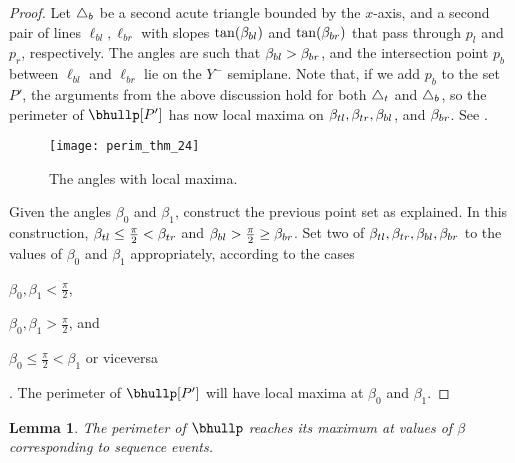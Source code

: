 \documentclass[11pt,letterpaper,english]{article}
\newtheorem{lemma}{Lemma}
\theoremstyle{definition}
\begin{document}
\begin{proof}
  Let $\triangle_b$ be a second acute triangle bounded by the $x$-axis, and
  a second pair of lines $\ell_{bl},\ell_{br}$ with slopes
  $\tan(\beta_{bl})$ and $\tan(\beta_{br})$ that pass through $p_l$ and $p_r$,
  respectively. The angles are such that $\beta_{bl} > \beta_{br}$, and the
  intersection point $p_b$ between $\ell_{bl}$ and $\ell_{br}$ lie on
  the $Y^-$ semiplane. Note that, if we add $p_b$ to the set $P'$, the
  arguments from the above discussion hold for both $\triangle_t$ and
  $\triangle_b$, so the perimeter of $\bhullp[P']$ has now local maxima on
  $\beta_{tl}, \beta_{tr}, \beta_{bl}$, and
  $\beta_{br}$. See .

  \begin{figure}[ht]
    \centering
    \begin{minipage}{0.9\textwidth}
      \centering
      \texttt{[image: perim\_thm\_24]}
      \caption{The angles with local maxima.}
      \label{apps:perim:fig:bimodal_2}
    \end{minipage}
  \end{figure}

  Given the angles $\beta_0$ and $\beta_1$, construct the previous
  point set as explained. In this construction,
  $\beta_{tl} \leq \frac{\pi}{2} < \beta_{tr}$ and
  $\beta_{bl} > \frac{\pi}{2} \geq \beta_{br}$. Set two of
  $\beta_{tl}, \beta_{tr}, \beta_{bl}, \beta_{br}$ to the values of $\beta_0$ and
  $\beta_1$ appropriately, according to the cases
  \begin{inparaenum}
  \item $\beta_0,\beta_1 < \frac{\pi}{2}$,
  \item $\beta_0,\beta_1 > \frac{\pi}{2}$, and
  \item $\beta_0 \leq \frac{\pi}{2} < \beta_1$ or
    viceversa\end{inparaenum}. The perimeter of $\bhullp[P']$ will
  have local maxima at $\beta_0$ and $\beta_1$.
\end{proof}

\begin{lemma}\label{apps:perim:lemma:events}
  The perimeter of $\bhullp$ reaches its maximum at values of $\beta$
  corresponding to sequence events.
\end{lemma}
\end{document}
